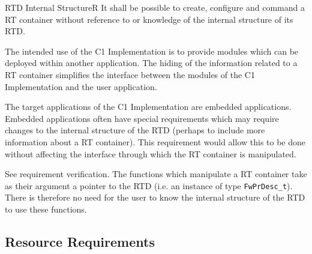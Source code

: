\documentclass[requirements]{../fwprofile}
\begin{document}
\begin{fw_req}{RTD Internal Structure}{R}
{It shall be possible to create, configure and command a RT container without reference to or knowledge of the internal structure of its RTD.}
{The intended use of the C1 Implementation is to provide modules which can be deployed within another application. The hiding of the information related to a RT container simplifies the interface between the modules of the C1 Implementation and the user application.

The target applications of the C1 Implementation are embedded applications. Embedded applications often have special requirements which may require changes to the internal
structure of the RTD (perhaps to include more information about a RT container). This requirement would allow this to be done without affecting the interface through which 
the RT container is manipulated.} 
{See requirement verification.} 
{The functions which manipulate a RT container take as their argument a pointer to the RTD (i.e. an instance of type \texttt{FwPrDesc\_t}). There is therefore no need for the user to know the internal structure of the RTD to use these functions.}
\end{fw_req}


\subsection{Resource Requirements}\label{req:resourceReqs}
\end{document}
